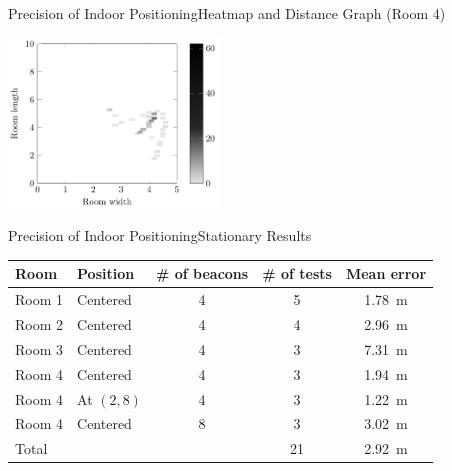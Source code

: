 \begin{frame}{Precision of Indoor Positioning}{Heatmap and Distance Graph (Room 4)}
	\centering\vfill
	  \begin{minipage}[b]{0.49\textwidth}
	  	\centering
	  	\includegraphics[width=\textwidth, height=4.5cm]{../data/estimote-test-results/heatmaps/pdf/36}
			\vspace{0.35cm}
	  \end{minipage}\hfill
	  \begin{minipage}[b]{0.49\textwidth}
	  	\centering      
	  \end{minipage}
\end{frame}

\begin{frame}{Precision of Indoor Positioning}{Stationary Results}
  \centering
  \begin{tabular}{l|l c c c}
  	Room   & Position   & \# of beacons & \# of tests & Mean error        \\ \hline
  	Room 1 & Centered   & \num{4}       & 5           & \SI{1.78}{\meter} \\
  	Room 2 & Centered   & \num{4}       & 4           & \SI{2.96}{\meter} \\
  	Room 3 & Centered   & \num{4}       & 3           & \SI{7.31}{\meter} \\
  	Room 4 & Centered   & \num{4}       & 3           & \SI{1.94}{\meter} \\
  	Room 4 & At $(2,8)$ & \num{4}       & 3           & \SI{1.22}{\meter} \\
  	Room 4 & Centered   & \num{8}       & 3           & \SI{3.02}{\meter} \\ \hline
  	Total  &            &               & 21          & \SI{2.92}{\meter}
  \end{tabular}
\end{frame}

